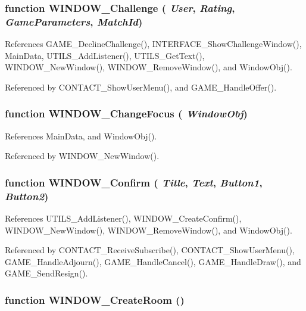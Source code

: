 \subsubsection{\setlength{\rightskip}{0pt plus 5cm}function WINDOW\_\-Challenge ( {\em User}, \/   {\em Rating}, \/   {\em GameParameters}, \/   {\em MatchId})}\label{window_2window_8js_fce69c99efa3a722eba86a87121ae114}




References GAME\_\-DeclineChallenge(), INTERFACE\_\-ShowChallengeWindow(), MainData, UTILS\_\-AddListener(), UTILS\_\-GetText(), WINDOW\_\-NewWindow(), WINDOW\_\-RemoveWindow(), and WindowObj().

Referenced by CONTACT\_\-ShowUserMenu(), and GAME\_\-HandleOffer().
\subsubsection{\setlength{\rightskip}{0pt plus 5cm}function WINDOW\_\-ChangeFocus ( {\em WindowObj})}\label{window_2window_8js_350ad94a4dacfeb72ee42df746f19cf2}




References MainData, and WindowObj().

Referenced by WINDOW\_\-NewWindow().
\subsubsection{\setlength{\rightskip}{0pt plus 5cm}function WINDOW\_\-Confirm ( {\em Title}, \/   {\em Text}, \/   {\em Button1}, \/   {\em Button2})}\label{window_2window_8js_cf8bd95031baaa8a5b88de2cc0848015}




References UTILS\_\-AddListener(), WINDOW\_\-CreateConfirm(), WINDOW\_\-NewWindow(), WINDOW\_\-RemoveWindow(), and WindowObj().

Referenced by CONTACT\_\-ReceiveSubscribe(), CONTACT\_\-ShowUserMenu(), GAME\_\-HandleAdjourn(), GAME\_\-HandleCancel(), GAME\_\-HandleDraw(), and GAME\_\-SendResign().
\subsubsection{\setlength{\rightskip}{0pt plus 5cm}function WINDOW\_\-CreateRoom ()}\label{window_2window_8js_b4a012d4090056d8eb763793e32bc5b5}




